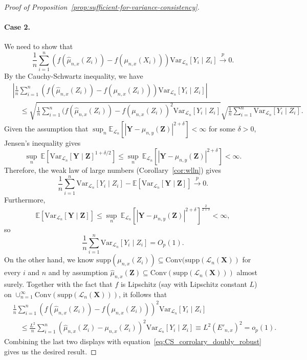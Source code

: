 \documentclass[aos]{imsart}
\theoremstyle{plain}
\theoremstyle{remark}
\newcommand{\E}{\mathbb E}								%
\newcommand{\V}{\mathrm{Var}}							%
\newcommand{\convp}{\overset p \rightarrow}             %
\newcommand{\prx}{\bm X}								%
\newcommand{\srx}{X}									%
\newcommand{\prz}{\bm Z}								%
\newcommand{\srz}{Z}									%
\newcommand{\pry}{{\bm Y}}								%
\newcommand{\sry}{Y}									%
\newcommand{\law}{\mathcal L}							%
\begin{document}
\begin{proof}[Proof of Proposition~\ref{prop:sufficient-for-variance-consistency}]
\paragraph*{Case 2.}
We need to show that
$$
\frac{1}{n} \sum_{i=1}^n (f(\widehat \mu_{n,x}(Z_i))-f(\mu_{n,x}(\srx_i)))\V_{\law_n}[\sry_i\mid \srz_i] \convp 0.
$$
By the Cauchy-Schwartz inequality, we have
\begin{equation}
\begin{split} \label{eq:CS_corrolary_doubly_robust}
	&\left|\frac{1}{n} \sum_{i=1}^n (f(\widehat \mu_{n,x}(\srz_i))-f(\mu_{n,x}(\srz_i)))\V_{\law_n}[\sry_i\mid \srz_i]\right| \\ &\quad\leq \sqrt{\frac{1}{n} \sum_{i=1}^n (f(\widehat \mu_{n,x}(Z_i))-f( \mu_{n,x}(Z_i))^2\V_{\law_n}[\sry_i\mid \srz_i]}\sqrt{\frac{1}{n} \sum_{i=1}^n \V_{\law_n}[\sry_i\mid \srz_i]}.
\end{split}
\end{equation}
Given the assumption that $\sup_n \E_{\law_n}[|\pry-\mu_{n,y}(\prz)|^{2+\delta}] < \infty$ for some $\delta>0$, Jensen's inequality gives
\begin{equation*}
	\sup_n\ \E[\V_{\law_n}[\pry\mid \prz]^{1+\delta/2}] \leq \sup_n\ \E_{\law_n}[|\pry-\mu_{n,y}(\prz)|^{2+\delta}] < \infty.
\end{equation*}
Therefore, the weak law of large numbers (Corollary~\ref{cor:wlln}) gives
\begin{equation*}
\frac{1}{n} \sum_{i=1}^n \V_{\law_n}[\sry_i\mid \srz_i]- \E[\V_{\law_n}[\pry\mid \prz]]\convp 0.
\end{equation*}
Furthermore, 
\begin{equation*}
\E[\V_{\law_n}[\pry\mid \prz]] \leq \sup_n\ \E_{\law_n}[|\pry-\mu_{n,y}(\prz)|^{2+\delta}]^{\frac2{2+\delta}} < \infty,
\end{equation*}
so 
\begin{equation*}
	\frac{1}{n} \sum_{i=1}^n \V_{\law_n}[\sry_i\mid \srz_i] = O_p(1).
\end{equation*}
On the other hand, we know $\mathrm{supp}(\mu_{n,x}(Z_i))\subseteq \mathrm{Conv}(\mathrm{supp}(\law_n(\prx))$ for every $i$ and $n$ and by assumption $\widehat{\mu}_{n,x}(\prz)\subseteq\mathrm{Conv}(\mathrm{supp}(\law_n(\prx)))$ almost surely. Together with the fact that $f$ is Lipschitz (say with Lipschitz constant $L$) on $\cup_{n=1}^{\infty}\mathrm{Conv}(\mathrm{supp}(\law_n(\prx)))$, it follows that
\begin{align*}
&\frac{1}{n} \sum_{i=1}^n (f(\widehat \mu_{n,x}(Z_i))-f( \mu_{n,x}(Z_i)))^2\V_{\law_n}[\sry_i\mid \srz_i] \\
&\quad\leq 
\frac{L^2}{n} \sum_{i=1}^n (\widehat \mu_{n,x}(Z_i)- \mu_{n,x}(Z_i))^2\V_{\law_n}[\sry_i\mid \srz_i] \equiv L^2(E'_{n,x})^2 = o_p(1).
\end{align*}
Combining the last two displays with equation~\eqref{eq:CS_corrolary_doubly_robust} gives us the desired result.
\end{proof}
\end{document}
